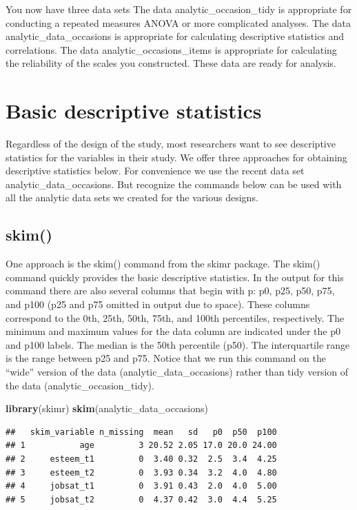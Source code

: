 \documentclass[
]{krantz}
\makeatletter
\newenvironment{Shaded}{\begin{snugshade}}{\end{snugshade}}
\newcommand{\KeywordTok}[1]{\textcolor[rgb]{0.27,0.27,0.27}{\textbf{#1}}}
\newcommand{\NormalTok}[1]{#1}
\newenvironment{kframe}{%
\medskip{}
\setlength{\fboxsep}{.8em}
 \def\at@end@of@kframe{}%
 \ifinner\ifhmode%
  \def\at@end@of@kframe{\end{minipage}}%
  \begin{minipage}{\columnwidth}%
 \fi\fi%
 \def\FrameCommand##1{\hskip\@totalleftmargin \hskip-\fboxsep
 \colorbox{shadecolor}{##1}\hskip-\fboxsep
     \hskip-\linewidth \hskip-\@totalleftmargin \hskip\columnwidth}%
 \MakeFramed {\advance\hsize-\width
   \@totalleftmargin\z@ \linewidth\hsize
   \@setminipage}}%
 {\par\unskip\endMakeFramed%
 \at@end@of@kframe}
\renewenvironment{Shaded}{\begin{kframe}}{\end{kframe}}
\makeatother
\begin{document}
You now have three data sets The data analytic\_occasion\_tidy is appropriate for conducting a repeated measures ANOVA or more complicated analyses. The data analytic\_data\_occasions is appropriate for calculating descriptive statistics and correlations. The data analytic\_occasions\_items is appropriate for calculating the reliability of the scales you constructed. These data are ready for analysis.

\hypertarget{basic-descriptive-statistics}{%
\section{Basic descriptive statistics}\label{basic-descriptive-statistics}}

Regardless of the design of the study, most researchers want to see descriptive statistics for the variables in their study. We offer three approaches for obtaining descriptive statistics below. For convenience we use the recent data set analytic\_data\_occasions. But recognize the commands below can be used with all the analytic data sets we created for the various designs.

\hypertarget{skim}{%
\subsection{skim()}\label{skim}}

One approach is the skim() command from the skimr package. The skim() command quickly provides the basic descriptive statistics. In the output for this command there are also several columns that begin with p: p0, p25, p50, p75, and p100 (p25 and p75 omitted in output due to space). These columns correspond to the 0th, 25th, 50th, 75th, and 100th percentiles, respectively. The minimum and maximum values for the data column are indicated under the p0 and p100 labels. The median is the 50th percentile (p50). The interquartile range is the range between p25 and p75. Notice that we run this command on the ``wide'' version of the data (analytic\_data\_occasions) rather than tidy version of the data (analytic\_occasion\_tidy).

\begin{Shaded}
\begin{Highlighting}[]
\KeywordTok{library}\NormalTok{(skimr)}
\KeywordTok{skim}\NormalTok{(analytic_data_occasions)}
\end{Highlighting}
\end{Shaded}

\begin{verbatim}
##   skim_variable n_missing  mean   sd   p0  p50  p100
## 1           age         3 20.52 2.05 17.0 20.0 24.00
## 2     esteem_t1         0  3.40 0.32  2.5  3.4  4.25
## 3     esteem_t2         0  3.93 0.34  3.2  4.0  4.80
## 4     jobsat_t1         0  3.91 0.43  2.0  4.0  5.00
## 5     jobsat_t2         0  4.37 0.42  3.0  4.4  5.25
\end{verbatim}
\end{document}
